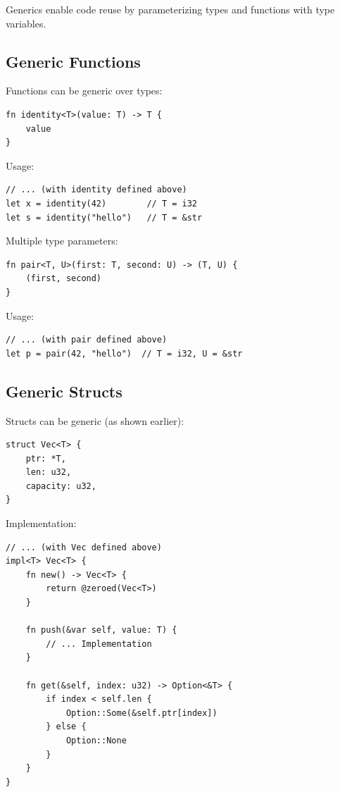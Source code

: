 Generics enable code reuse by parameterizing types and functions with type variables.

\subsection{Generic Functions}

Functions can be generic over types:

\begin{lstlisting}
fn identity<T>(value: T) -> T {
    value
}
\end{lstlisting}

Usage:

\begin{lstlisting}
// ... (with identity defined above)
let x = identity(42)        // T = i32
let s = identity("hello")   // T = &str
\end{lstlisting}

Multiple type parameters:

\begin{lstlisting}
fn pair<T, U>(first: T, second: U) -> (T, U) {
    (first, second)
}
\end{lstlisting}

Usage:

\begin{lstlisting}
// ... (with pair defined above)
let p = pair(42, "hello")  // T = i32, U = &str
\end{lstlisting}

\subsection{Generic Structs}

Structs can be generic (as shown earlier):

\begin{lstlisting}
struct Vec<T> {
    ptr: *T,
    len: u32,
    capacity: u32,
}
\end{lstlisting}

Implementation:

\begin{lstlisting}
// ... (with Vec defined above)
impl<T> Vec<T> {
    fn new() -> Vec<T> {
        return @zeroed(Vec<T>)
    }

    fn push(&var self, value: T) {
        // ... Implementation
    }

    fn get(&self, index: u32) -> Option<&T> {
        if index < self.len {
            Option::Some(&self.ptr[index])
        } else {
            Option::None
        }
    }
}
\end{lstlisting}

